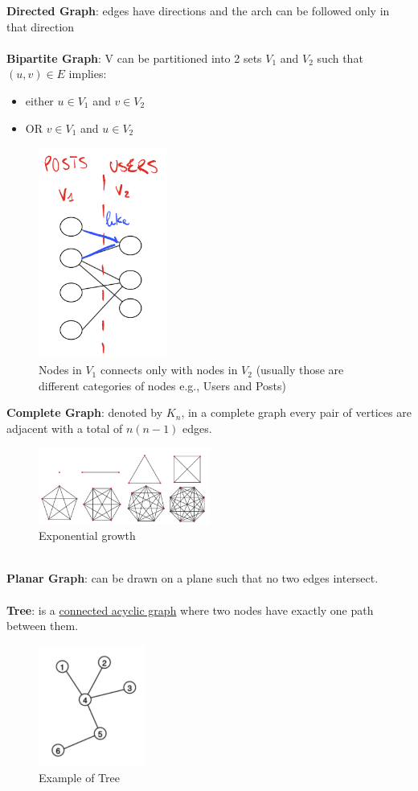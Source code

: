\documentclass[10pt,a4paper]{article}
\newcommand{\nline}{\\~\\}
\begin{document}
\textbf{Directed Graph}: edges have directions and the arch can be followed only in that direction
\nline
\textbf{Bipartite Graph}: V can be partitioned into 2 sets $V_1$ and $V_2$ such that $(u,v) \in E$ implies:
\begin{itemize}
	\item either $u \in V_1$ and $v \in V_2$
	\item OR $v \in V_1$ and $u \in V_2$
\end{itemize}
\begin{figure}[h!]
 \hfill \includegraphics[width=120pt]{images/bipartite-graph.png}\hspace*{\fill}
  \caption{Nodes in $V_1$ connects only with nodes in $V_2$ (usually those are different categories of nodes e.g., Users and Posts)}
\end{figure} 
\textbf{Complete Graph}: denoted by $K_n$, in a complete graph every pair of vertices are adjacent with a total of $n(n-1)$ edges.
\begin{figure}[h!]
 \hfill \includegraphics[width=160pt]{images/complete-graph.png}\hspace*{\fill}
  \caption{Exponential growth}
\end{figure}  \\
\pagebreak
\textbf{Planar Graph}: can be drawn on a plane such that no two edges intersect. \nline
\textbf{Tree}: is a \uline{connected acyclic graph} where two nodes have exactly one path between them.
\begin{figure}[h!]
 \hfill \includegraphics[width=100pt]{images/tree-graph.png}\hspace*{\fill}
  \caption{Example of Tree}
\end{figure}  \\
\end{document}
